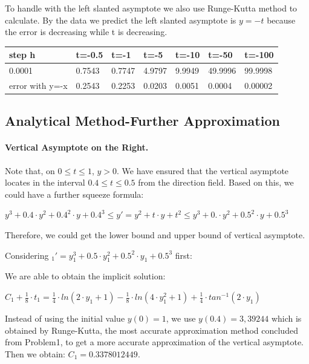 \documentclass[11pt,a4paper]{article}
\begin{document}
To handle with the left slanted asymptote we also use Runge-Kutta method to calculate. By the data we predict the left slanted asymptote is $y=-t$ because the error is decreasing while t is decreasing.

\begin{table}[H]
	\centering
	\begin{tabular}{l|l|l|l|l|l|l}
		step h          & t=-0.5 & t=-1   & t=-5   & t=-10  & t=-50   & t=-100  \\ \hline
		0.0001          & 0.7543 & 0.7747 & 4.9797 & 9.9949 & 49.9996 & 99.9998 \\ \hline
		error with y=-x & 0.2543 & 0.2253 & 0.0203 & 0.0051 & 0.0004  & 0.00002 
	\end{tabular}
\end{table}

\subsection{Analytical Method-Further Approximation}
	\paragraph{Vertical Asymptote on the Right.} Note that, on $0 \leq t \leq 1$, $y > 0$. We have ensured that the vertical asymptote locates in the interval $0.4 \leq t \leq 0.5$ from the direction field. Based on this, we could have a further squeeze formula: 
	
	\begin{center}
		$y^3+0.4 \cdot y^2 + 0.4^2 \cdot y + 0.4^3 \leq y' = y^2+t \cdot y + t^2 \leq y^3 + 0. \cdot y^2 + 0.5^2 \cdot y + 0.5^3$
	\end{center}
	
	Therefore, we could get the lower bound and upper bound of vertical asymptote. 
	
	Considering $_1'=y_1^3+0.5 \cdot y_1^2 + 0.5^2 \cdot y_1 + 0.5^3$ first:
	
	We are able to obtain the implicit solution:
	
	\begin{center}
		$C_1+\frac{1}{8} \cdot t_1 = \frac{1}{4} \cdot ln(2 \cdot y_1+1)- \frac{1}{8}\cdot ln(4\cdot y_1^2+1)+\frac{1}{4}\cdot tan^{-1}(2 \cdot y_1)$
	\end{center}
	
	Instead of using the initial value $y(0)=1$, we use $y(0.4)=3,39244$ which is obtained by Runge-Kutta, the most accurate approximation method concluded from Problem1, to get a more accurate approximation of the vertical asymptote. Then we obtain: $C_1=0.3378012449$.
	
\end{document}
